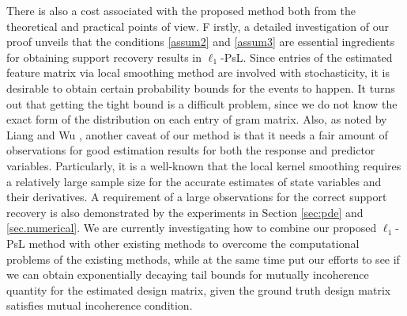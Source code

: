 \documentclass[a4paper,11pt]{article}
\theoremstyle{definition}
\begin{document}
There is also a cost associated with the proposed method both from the theoretical and practical points of view. F irstly, a detailed investigation of our proof unveils that the conditions \eqref{assum2} and \eqref{assum3} are essential ingredients for obtaining support recovery results in $\ell_{1}$-PsL. Since entries of the estimated feature matrix via local smoothing method are involved with stochasticity, it is desirable to obtain certain probability bounds for the events to happen.
It turns out that getting the tight bound is a difficult problem, since we do not know the exact form of the distribution on each entry of gram matrix. Also, as noted by Liang and Wu \cite{liang2008parameter}, another caveat of our method is that it needs a fair amount of observations for good estimation results for both the response and predictor variables. Particularly, it is a well-known that the local kernel smoothing requires a relatively large sample size for the accurate estimates of state variables and their derivatives. A requirement of a large observations for the correct support recovery is also demonstrated by the experiments in Section \ref{sec:pde} and \ref{sec.numerical}.
We are currently investigating how to combine our proposed $\ell_{1}$-PsL method with other existing methods to overcome the computational problems of the existing methods, while at the same time put our efforts to see if we can obtain exponentially decaying tail bounds for mutually incoherence quantity for the estimated design matrix, given the ground truth design matrix satisfies mutual incoherence condition.
\end{document}
